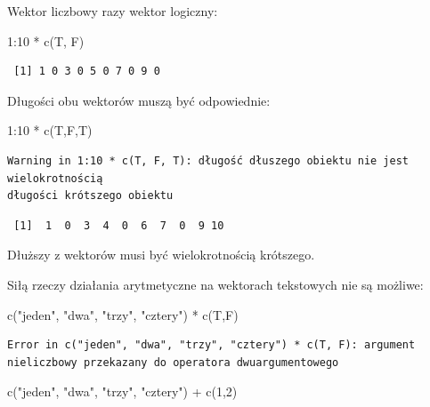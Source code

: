 \documentclass[
  letterpaper,
  DIV=11,
  numbers=noendperiod]{scrreprt}
\newenvironment{Shaded}{\begin{snugshade}}{\end{snugshade}}
\newcommand{\DecValTok}[1]{\textcolor[rgb]{0.68,0.00,0.00}{#1}}
\newcommand{\FunctionTok}[1]{\textcolor[rgb]{0.28,0.35,0.67}{#1}}
\newcommand{\NormalTok}[1]{\textcolor[rgb]{0.00,0.23,0.31}{#1}}
\newcommand{\SpecialCharTok}[1]{\textcolor[rgb]{0.37,0.37,0.37}{#1}}
\newcommand{\StringTok}[1]{\textcolor[rgb]{0.13,0.47,0.30}{#1}}
\begin{document}
Wektor liczbowy razy wektor logiczny:

\begin{Shaded}
\begin{Highlighting}[]
\DecValTok{1}\SpecialCharTok{:}\DecValTok{10} \SpecialCharTok{*} \FunctionTok{c}\NormalTok{(T, F)}
\end{Highlighting}
\end{Shaded}

\begin{verbatim}
 [1] 1 0 3 0 5 0 7 0 9 0
\end{verbatim}

Długości obu wektorów muszą być odpowiednie:

\begin{Shaded}
\begin{Highlighting}[]
\DecValTok{1}\SpecialCharTok{:}\DecValTok{10} \SpecialCharTok{*} \FunctionTok{c}\NormalTok{(T,F,T)}
\end{Highlighting}
\end{Shaded}

\begin{verbatim}
Warning in 1:10 * c(T, F, T): długość dłuszego obiektu nie jest wielokrotnością
długości krótszego obiektu
\end{verbatim}

\begin{verbatim}
 [1]  1  0  3  4  0  6  7  0  9 10
\end{verbatim}

Dłuższy z wektorów musi być wielokrotnością krótszego.

Siłą rzeczy działania arytmetyczne na wektorach tekstowych nie są
możliwe:

\begin{Shaded}
\begin{Highlighting}[]
\FunctionTok{c}\NormalTok{(}\StringTok{"jeden"}\NormalTok{, }\StringTok{"dwa"}\NormalTok{, }\StringTok{"trzy"}\NormalTok{, }\StringTok{"cztery"}\NormalTok{) }\SpecialCharTok{*} \FunctionTok{c}\NormalTok{(T,F)}
\end{Highlighting}
\end{Shaded}

\begin{verbatim}
Error in c("jeden", "dwa", "trzy", "cztery") * c(T, F): argument nieliczbowy przekazany do operatora dwuargumentowego
\end{verbatim}

\begin{Shaded}
\begin{Highlighting}[]
\FunctionTok{c}\NormalTok{(}\StringTok{"jeden"}\NormalTok{, }\StringTok{"dwa"}\NormalTok{, }\StringTok{"trzy"}\NormalTok{, }\StringTok{"cztery"}\NormalTok{) }\SpecialCharTok{+} \FunctionTok{c}\NormalTok{(}\DecValTok{1}\NormalTok{,}\DecValTok{2}\NormalTok{)}
\end{Highlighting}
\end{Shaded}
\end{document}
